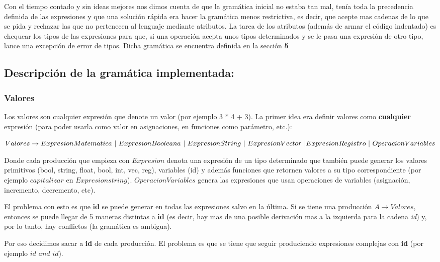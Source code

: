Con el tiempo contado y sin ideas mejores nos dimos cuenta de que la gramática inicial no estaba tan mal, tenía toda la precedencia definida de las expresiones y que una solución rápida era hacer la gramática menos restrictiva, es decir, que acepte mas cadenas de lo que se pida y rechazar las que no pertenecen al lenguaje mediante atributos. La tarea de los atributos (además de armar el código indentado) es chequear los tipos de las expresiones para que, si una operación acepta unos tipos determinados y se le pasa una expresión de otro tipo, lance una excepción de error de tipos. Dicha gramática se encuentra definida en la sección \textbf{5}

\subsection{Descripción de la gramática implementada:}

\subsubsection{Valores}
Los valores son cualquier expresión que denote un valor (por ejemplo 3 * 4 + 3). La primer idea era definir valores como \textbf{cualquier} expresión (para poder usarla como valor en asignaciones, en funciones como parámetro, etc.):

$Valores \rightarrow ExpresionMatematica \  | \  ExpresionBooleana \  | \ ExpresionString  \ | \ ExpresionVector \ | \ \\ ExpresionRegistro \ | \ OperacionVariables $

Donde cada producción que empieza con $Expresion$ denota una expresión de un tipo determinado que también puede generar los valores primitivos (bool, string, float, bool, int, vec, reg), variables (id) y además funciones que retornen valores a su tipo correspondiente (por ejemplo $capitalizar$ en $Expresionstring$). $OperacionVariables$ genera las expresiones que usan operaciones de variables (asignación, incremento, decremento, etc). 

El problema con esto es que \textbf{id} se puede generar en todas las expresiones salvo en la última. Si se tiene una producción $A \rightarrow Valores$, entonces se puede llegar de 5 maneras distintas a \textbf{id} (es decir, hay mas de una posible derivación mas a la izquierda para la cadena \textit{id}) y, por lo tanto, hay conflictos (la gramática es ambigua). 

Por eso decidimos sacar a \textbf{id} de cada producción. El problema es que se tiene que seguir produciendo expresiones complejas con \textbf{id} (por ejemplo $id$ $and$ $id$).

